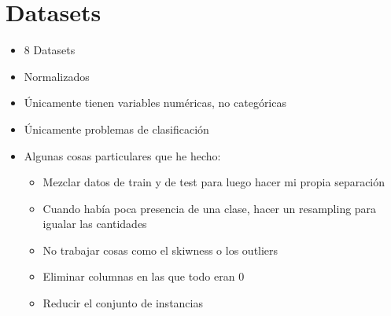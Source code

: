 \section{Datasets}
\begin{note}
  \begin{itemize}
    \item 8 Datasets
    \item Normalizados
    \item Únicamente tienen variables numéricas, no categóricas
    \item Únicamente problemas de clasificación
    \item Algunas cosas particulares que he hecho:
    \begin{itemize}
      \item Mezclar datos de train y de test para luego hacer mi propia
      separación
      \item Cuando había poca presencia de una clase, hacer un resampling para
      igualar las cantidades
      \item No trabajar cosas como el skiwness o los outliers
      \item Eliminar columnas en las que todo eran 0
      \item Reducir el conjunto de instancias
    \end{itemize}
  \end{itemize}
\end{note}
